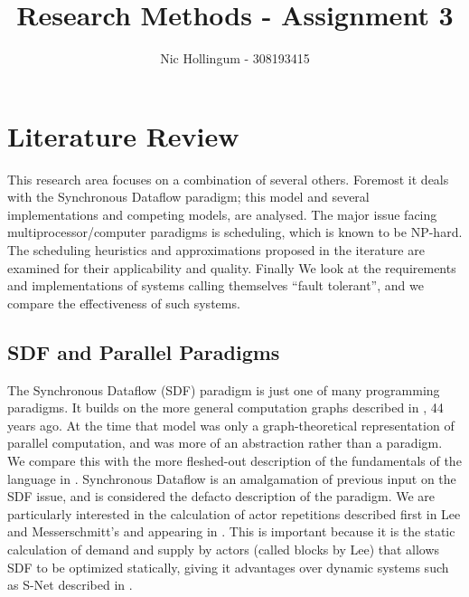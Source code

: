 
\author{Nic Hollingum - 308193415}
\title{Research Methods - Assignment 3}



\maketitle

\section*{Literature Review}

This research area focuses on a combination of several others.
Foremost it deals with the Synchronous Dataflow paradigm; this model and several implementations and competing models, are analysed.
The major issue facing multiprocessor/computer paradigms is scheduling, which is known to be NP-hard.
The scheduling heuristics and approximations proposed in the iterature are examined for their applicability and quality.
Finally We look at the requirements and implementations of systems calling themselves ``fault tolerant'', and we compare the effectiveness of such systems.

\subsection*{SDF and Parallel Paradigms}

The Synchronous Dataflow (SDF) paradigm is just one of many programming paradigms.
It builds on the more general computation graphs described in \cite{kar66}, 44 years ago.
At the time that model was only a graph-theoretical representation of parallel computation, and was more of an abstraction rather than a paradigm.
We compare this with the more fleshed-out description of the fundamentals of the language in \cite{sdfBook}.
Synchronous Dataflow is an amalgamation of previous input on the SDF issue, and is considered the defacto description of the paradigm.
We are particularly interested in the calculation of actor repetitions described first in Lee and Messerschmitt's \cite{lee87} and appearing in \cite{sdfBook}.
This is important because it is the static calculation of demand and supply by actors (called blocks by Lee) that allows SDF to be optimized statically, giving it advantages over dynamic systems such as S-Net described in \cite{pen09}.

